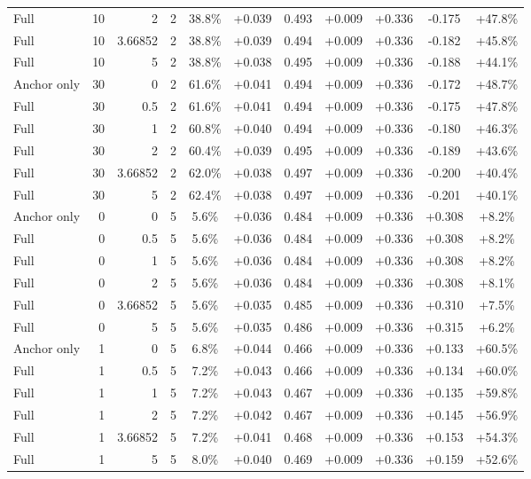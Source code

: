 \begin{table}[htbp]
\begin{tabular}{lrrrccccccc}
Full & 10 & 2 & 2 & 38.8\% & +0.039 & 0.493 & +0.009 & +0.336 & -0.175 & +47.8\% \\
Full & 10 & 3.66852 & 2 & 38.8\% & +0.039 & 0.494 & +0.009 & +0.336 & -0.182 & +45.8\% \\
Full & 10 & 5 & 2 & 38.8\% & +0.038 & 0.495 & +0.009 & +0.336 & -0.188 & +44.1\% \\
Anchor only & 30 & 0 & 2 & 61.6\% & +0.041 & 0.494 & +0.009 & +0.336 & -0.172 & +48.7\% \\
Full & 30 & 0.5 & 2 & 61.6\% & +0.041 & 0.494 & +0.009 & +0.336 & -0.175 & +47.8\% \\
Full & 30 & 1 & 2 & 60.8\% & +0.040 & 0.494 & +0.009 & +0.336 & -0.180 & +46.3\% \\
Full & 30 & 2 & 2 & 60.4\% & +0.039 & 0.495 & +0.009 & +0.336 & -0.189 & +43.6\% \\
Full & 30 & 3.66852 & 2 & 62.0\% & +0.038 & 0.497 & +0.009 & +0.336 & -0.200 & +40.4\% \\
Full & 30 & 5 & 2 & 62.4\% & +0.038 & 0.497 & +0.009 & +0.336 & -0.201 & +40.1\% \\
Anchor only & 0 & 0 & 5 & 5.6\% & +0.036 & 0.484 & +0.009 & +0.336 & +0.308 & +8.2\% \\
Full & 0 & 0.5 & 5 & 5.6\% & +0.036 & 0.484 & +0.009 & +0.336 & +0.308 & +8.2\% \\
Full & 0 & 1 & 5 & 5.6\% & +0.036 & 0.484 & +0.009 & +0.336 & +0.308 & +8.2\% \\
Full & 0 & 2 & 5 & 5.6\% & +0.036 & 0.484 & +0.009 & +0.336 & +0.308 & +8.1\% \\
Full & 0 & 3.66852 & 5 & 5.6\% & +0.035 & 0.485 & +0.009 & +0.336 & +0.310 & +7.5\% \\
Full & 0 & 5 & 5 & 5.6\% & +0.035 & 0.486 & +0.009 & +0.336 & +0.315 & +6.2\% \\
Anchor only & 1 & 0 & 5 & 6.8\% & +0.044 & 0.466 & +0.009 & +0.336 & +0.133 & +60.5\% \\
Full & 1 & 0.5 & 5 & 7.2\% & +0.043 & 0.466 & +0.009 & +0.336 & +0.134 & +60.0\% \\
Full & 1 & 1 & 5 & 7.2\% & +0.043 & 0.467 & +0.009 & +0.336 & +0.135 & +59.8\% \\
Full & 1 & 2 & 5 & 7.2\% & +0.042 & 0.467 & +0.009 & +0.336 & +0.145 & +56.9\% \\
Full & 1 & 3.66852 & 5 & 7.2\% & +0.041 & 0.468 & +0.009 & +0.336 & +0.153 & +54.3\% \\
Full & 1 & 5 & 5 & 8.0\% & +0.040 & 0.469 & +0.009 & +0.336 & +0.159 & +52.6\% \\

\end{tabular}
\end{table}
